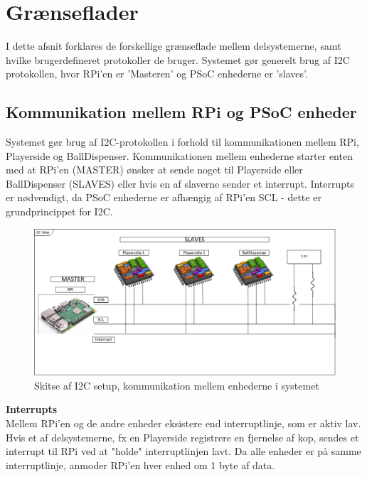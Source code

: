 \documentclass[Arkitektur/System_main.tex]{subfiles}
\begin{document}
\section{Grænseflader}
I dette afsnit forklares de forskellige grænseflade mellem delsystemerne, samt hvilke brugerdefineret protokoller de bruger. Systemet gør generelt brug af I2C protokollen, hvor RPi'en er 'Masteren' og PSoC enhederne er 'slaves'. 


\subsection{Kommunikation mellem RPi og PSoC enheder}


Systemet gør brug af I2C-protokollen i forhold til kommunikationen mellem RPi, Playerside og BallDispenser. Kommunikationen mellem enhederne starter enten med at RPi'en (MASTER) ønsker at sende noget til Playerside eller BallDispenser (SLAVES) eller hvis en af slaverne sender et interrupt. Interrupts er nødvendigt, da PSoC enhederne er afhængig af RPi'en SCL - dette er grundprincippet for I2C. 

\begin{figure}[H]
    \centering
    \includegraphics[width=\textwidth]{Arkitektur/Grenseflader/Graphics/i2c.png}
    \caption{Skitse af I2C setup, kommunikation mellem enhederne i systemet}
    \label{fig:i2c_setup}
\end{figure}

\textbf{Interrupts}
\\Mellem RPi'en og de andre enheder eksistere end interruptlinje, som er aktiv lav. Hvis et af delsystemerne, fx en Playerside registrere en fjernelse af kop, sendes et interrupt til RPi ved at "holde" interruptlinjen lavt. Da alle enheder er på samme interruptlinje, anmoder RPi'en hver enhed om 1 byte af data.
\end{document}
